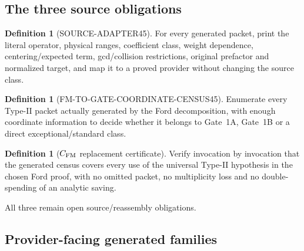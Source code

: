 \documentclass[11pt]{article}
\theoremstyle{definition}
\newtheorem{definition}[theorem]{Definition}
\newcommand{\1}{\mathbf 1}
\begin{document}
\subsection{The three source obligations}

\begin{definition}[SOURCE-ADAPTER45]
For every generated packet, print the literal operator, physical ranges, coefficient
class, weight dependence, centering/expected term, gcd/collision restrictions, original
prefactor and normalized target, and map it to a proved provider without changing the
source class.
\end{definition}

\begin{definition}[FM-TO-GATE-COORDINATE-CENSUS45]
Enumerate every Type-II packet actually generated by the Ford decomposition, with enough
coordinate information to decide whether it belongs to Gate~1A, Gate~1B or a direct
exceptional/standard class.
\end{definition}

\begin{definition}[$C_{\rm FM}$ replacement certificate]
Verify invocation by invocation that the generated census covers every use of the universal
Type-II hypothesis in the chosen Ford proof, with no omitted packet, no multiplicity loss
and no double-spending of an analytic saving.
\end{definition}

All three remain open source/reassembly obligations.

\subsection{Provider-facing generated families}
\end{document}
